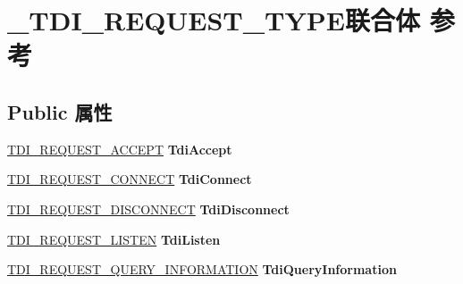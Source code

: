 \hypertarget{union___t_d_i___r_e_q_u_e_s_t___t_y_p_e}{}\section{\+\_\+\+T\+D\+I\+\_\+\+R\+E\+Q\+U\+E\+S\+T\+\_\+\+T\+Y\+P\+E联合体 参考}
\label{union___t_d_i___r_e_q_u_e_s_t___t_y_p_e}
\subsection*{Public 属性}
\begin{DoxyCompactItemize}
\item 
\mbox{\label{union___t_d_i___r_e_q_u_e_s_t___t_y_p_e_aaf15498ad28d53f1ed0729ebaa33abc5}} 
\hyperlink{struct___t_d_i___r_e_q_u_e_s_t___a_c_c_e_p_t}{T\+D\+I\+\_\+\+R\+E\+Q\+U\+E\+S\+T\+\_\+\+A\+C\+C\+E\+PT} {\bfseries Tdi\+Accept}
\item 
\mbox{\label{union___t_d_i___r_e_q_u_e_s_t___t_y_p_e_a578401a965f5f138bc67fd49b12c3c9b}} 
\hyperlink{struct___t_d_i___c_o_n_n_e_c_t___r_e_q_u_e_s_t}{T\+D\+I\+\_\+\+R\+E\+Q\+U\+E\+S\+T\+\_\+\+C\+O\+N\+N\+E\+CT} {\bfseries Tdi\+Connect}
\item 
\mbox{\label{union___t_d_i___r_e_q_u_e_s_t___t_y_p_e_a0ceb80219c7459f2832b80452ed26485}} 
\hyperlink{struct___t_d_i___d_i_s_c_o_n_n_e_c_t___r_e_q_u_e_s_t}{T\+D\+I\+\_\+\+R\+E\+Q\+U\+E\+S\+T\+\_\+\+D\+I\+S\+C\+O\+N\+N\+E\+CT} {\bfseries Tdi\+Disconnect}
\item 
\mbox{\label{union___t_d_i___r_e_q_u_e_s_t___t_y_p_e_ae2c13c5530dc243fa769eaf33f0e4119}} 
\hyperlink{struct___t_d_i___r_e_q_u_e_s_t___l_i_s_t_e_n}{T\+D\+I\+\_\+\+R\+E\+Q\+U\+E\+S\+T\+\_\+\+L\+I\+S\+T\+EN} {\bfseries Tdi\+Listen}
\item 
\mbox{\label{union___t_d_i___r_e_q_u_e_s_t___t_y_p_e_aaa8b375dcc3aab387ea5fb36725a5fca}} 
\hyperlink{struct___t_d_i___r_e_q_u_e_s_t___q_u_e_r_y___i_n_f_o_r_m_a_t_i_o_n}{T\+D\+I\+\_\+\+R\+E\+Q\+U\+E\+S\+T\+\_\+\+Q\+U\+E\+R\+Y\+\_\+\+I\+N\+F\+O\+R\+M\+A\+T\+I\+ON} {\bfseries Tdi\+Query\+Information}

\end{DoxyCompactItemize}
